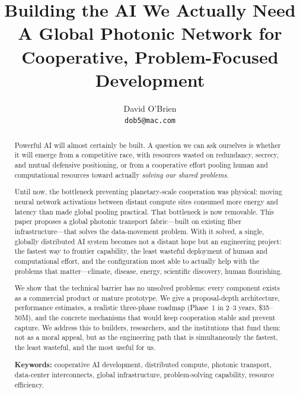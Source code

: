 \documentclass[12pt]{article}
\title{\textbf{Building the AI We Actually Need}\\[6pt]
\large A Global Photonic Network for Cooperative, Problem-Focused Development}
\author{David O'Brien\\
\small \texttt{dob5@mac.com}}
\date{}
\begin{document}
\maketitle

\begin{abstract}
\noindent Powerful AI will almost certainly be built. A question we can ask ourselves is whether it
will emerge from a competitive race, with resources wasted on redundancy,
secrecy, and mutual defensive positioning, or from a cooperative effort pooling
human and computational resources toward actually \emph{solving our shared problems}.
\par
Until now, the bottleneck preventing planetary-scale cooperation was physical:
moving neural network activations between distant compute sites consumed more
energy and latency than made global pooling practical. That bottleneck is now
removable. This paper proposes a global photonic transport fabric---built on
existing fiber infrastructure---that solves the data-movement problem. With it
solved, a single, globally distributed AI system becomes not a distant hope but
an engineering project: the fastest way to frontier capability, the least
wasteful deployment of human and computational effort, and the configuration
most able to actually help with the problems that matter---climate, disease,
energy, scientific discovery, human flourishing.
\par
We show that the technical barrier has no unsolved problems: every component
exists as a commercial product or mature prototype. We give a proposal-depth
architecture, performance estimates, a realistic three-phase roadmap (Phase~1 in
2--3 years, \$35--50M), and the concrete mechanisms that would keep cooperation
stable and prevent capture. We address this to builders, researchers, and the
institutions that fund them: not as a moral appeal, but as the engineering path
that is simultaneously the fastest, the least wasteful, and the most useful for us.

\vspace{8pt}
\noindent\textbf{Keywords:} cooperative AI development, distributed compute,
photonic transport, data-center interconnects, global infrastructure, problem-solving
capability, resource efficiency.
\end{abstract}
\end{document}
